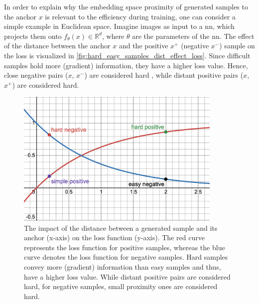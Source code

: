In order to explain why the embedding space proximity of generated samples to the anchor $x$ 
is relevant to the efficiency during training, 
one can consider a simple example in Euclidean space.
Imagine images as input to a \ac{nn}, which projects them onto $f_{\theta}(x) \in \mathbb{R}^d$, 
where $\theta$ are the parameters of the \ac{nn}.
The effect of the distance between the anchor $x$ and the positive $x^+$ (negative $x^-$) 
sample on the loss is visualized in \autoref{fig:hard_easy_samples_dist_effect_loss}.
Since difficult samples hold more (gradient) information, they have a higher loss value.
Hence, close negative pairs ($x$, $x^-$) are considered hard \citet{robinson_contrastive_2021}, 
while distant positive pairs ($x$, $x^+$) are considered hard.

%     

\begin{figure}[!htb] %
    \centering
    \includegraphics[width=280pt]{images/Hard_easy_samples_dist_effect_loss_desmos.png}
    \caption{The impact of the distance between a generated sample and its anchor (x-axis) on the loss function (y-axis).
    The red curve represents the loss function for positive samples, 
    whereas the blue curve denotes the loss function for negative samples.
    Hard samples convey more (gradient) information than easy samples and thus, have a higher loss value.
    While distant positive pairs are considered hard, for negative samples, small proximity ones are considered hard.}
    \label{fig:hard_easy_samples_dist_effect_loss}
\end{figure}